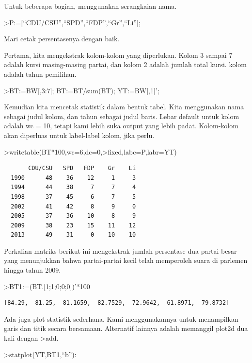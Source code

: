 \documentclass[
]{book}
\begin{document}
Untuk beberapa bagian, menggunakan serangkaian nama.

\textgreater P:={[}``CDU/CSU'',``SPD'',``FDP'',``Gr'',``Li''{]};

Mari cetak persentasenya dengan baik.

Pertama, kita mengekstrak kolom-kolom yang diperlukan. Kolom 3 sampai 7 adalah kursi masing-masing partai, dan kolom 2 adalah jumlah total kursi. kolom adalah tahun pemilihan.

\textgreater BT:=BW{[},3:7{]}; BT:=BT/sum(BT); YT:=BW{[},1{]}';

Kemudian kita mencetak statistik dalam bentuk tabel. Kita menggunakan nama sebagai judul kolom, dan tahun sebagai judul baris. Lebar default untuk kolom adalah wc = 10, tetapi kami lebih suka output yang lebih padat. Kolom-kolom akan diperluas untuk label-label kolom, jika perlu.

\textgreater writetable(BT*100,wc=6,dc=0,\textgreater fixed,labc=P,labr=YT)

\begin{verbatim}
       CDU/CSU   SPD   FDP    Gr    Li
  1990      48    36    12     1     3
  1994      44    38     7     7     4
  1998      37    45     6     7     5
  2002      41    42     8     9     0
  2005      37    36    10     8     9
  2009      38    23    15    11    12
  2013      49    31     0    10    10
\end{verbatim}

Perkalian matriks berikut ini mengekstrak jumlah persentase dua partai besar yang menunjukkan bahwa partai-partai kecil telah memperoleh suara di parlemen hingga tahun 2009.

\textgreater BT1:=(BT.{[}1;1;0;0;0{]})'*100

\begin{verbatim}
[84.29,  81.25,  81.1659,  82.7529,  72.9642,  61.8971,  79.8732]
\end{verbatim}

Ada juga plot statistik sederhana. Kami menggunakannya untuk menampilkan garis dan titik secara bersamaan. Alternatif lainnya adalah memanggil plot2d dua kali dengan \textgreater add.

\textgreater statplot(YT,BT1,``b''):
\end{document}
